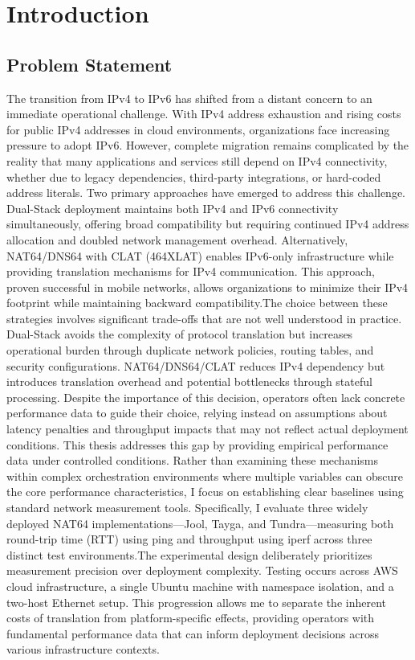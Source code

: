 \chapter{Introduction}
\section{Problem Statement}
The transition from IPv4 to IPv6 has shifted from a distant concern to an immediate operational challenge. With IPv4 address exhaustion and rising costs for public IPv4 addresses in cloud environments, organizations face increasing pressure to adopt IPv6. However, complete migration remains complicated by the reality that many applications and services still depend on IPv4 connectivity, whether due to legacy dependencies, third-party integrations, or hard-coded address literals.
Two primary approaches have emerged to address this challenge. Dual-Stack deployment maintains both IPv4 and IPv6 connectivity simultaneously, offering broad compatibility but requiring continued IPv4 address allocation and doubled network management overhead. Alternatively, NAT64/DNS64 with CLAT (464XLAT) enables IPv6-only infrastructure while providing translation mechanisms for IPv4 communication. This approach, proven successful in mobile networks, allows organizations to minimize their IPv4 footprint while maintaining backward compatibility.The choice between these strategies involves significant trade-offs that are not well understood in practice. Dual-Stack avoids the complexity of protocol translation but increases operational burden through duplicate network policies, routing tables, and security configurations. NAT64/DNS64/CLAT reduces IPv4 dependency but introduces translation overhead and potential bottlenecks through stateful processing. Despite the importance of this decision, operators often lack concrete performance data to guide their choice, relying instead on assumptions about latency penalties and throughput impacts that may not reflect actual deployment conditions.
This thesis addresses this gap by providing empirical performance data under controlled conditions. Rather than examining these mechanisms within complex orchestration environments where multiple variables can obscure the core performance characteristics, I focus on establishing clear baselines using standard network measurement tools. Specifically, I evaluate three widely deployed NAT64 implementations—Jool, Tayga, and Tundra—measuring both round-trip time (RTT) using ping and throughput using iperf across three distinct test environments.The experimental design deliberately prioritizes measurement precision over deployment complexity. Testing occurs across AWS cloud infrastructure, a single Ubuntu machine with namespace isolation, and a two-host Ethernet setup. This progression allows me to separate the inherent costs of translation from platform-specific effects, providing operators with fundamental performance data that can inform deployment decisions across various infrastructure contexts.
